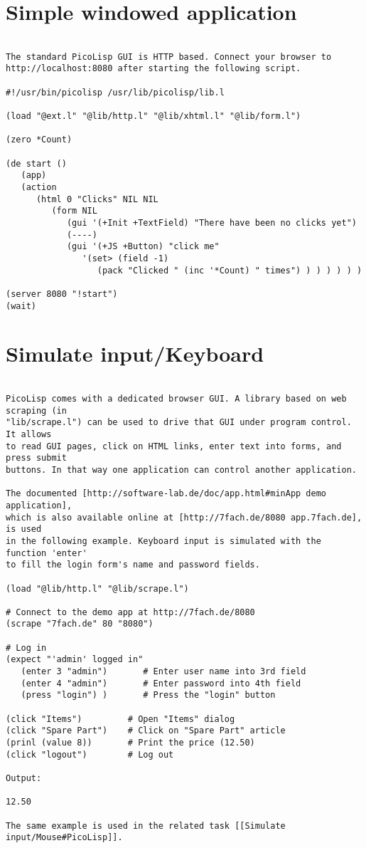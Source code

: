 \section*{Simple windowed application}

\begin{verbatim}

The standard PicoLisp GUI is HTTP based. Connect your browser to
http://localhost:8080 after starting the following script.

#!/usr/bin/picolisp /usr/lib/picolisp/lib.l

(load "@ext.l" "@lib/http.l" "@lib/xhtml.l" "@lib/form.l")

(zero *Count)

(de start ()
   (app)
   (action
      (html 0 "Clicks" NIL NIL
         (form NIL
            (gui '(+Init +TextField) "There have been no clicks yet")
            (----)
            (gui '(+JS +Button) "click me"
               '(set> (field -1)
                  (pack "Clicked " (inc '*Count) " times") ) ) ) ) ) )

(server 8080 "!start")
(wait)

\end{verbatim}

\section*{Simulate input/Keyboard}

\begin{verbatim}

PicoLisp comes with a dedicated browser GUI. A library based on web scraping (in
"lib/scrape.l") can be used to drive that GUI under program control. It allows
to read GUI pages, click on HTML links, enter text into forms, and press submit
buttons. In that way one application can control another application.

The documented [http://software-lab.de/doc/app.html#minApp demo application],
which is also available online at [http://7fach.de/8080 app.7fach.de], is used
in the following example. Keyboard input is simulated with the function 'enter'
to fill the login form's name and password fields.

(load "@lib/http.l" "@lib/scrape.l")

# Connect to the demo app at http://7fach.de/8080
(scrape "7fach.de" 80 "8080")

# Log in
(expect "'admin' logged in"
   (enter 3 "admin")       # Enter user name into 3rd field
   (enter 4 "admin")       # Enter password into 4th field
   (press "login") )       # Press the "login" button

(click "Items")         # Open "Items" dialog
(click "Spare Part")    # Click on "Spare Part" article
(prinl (value 8))       # Print the price (12.50)
(click "logout")        # Log out

Output:

12.50

The same example is used in the related task [[Simulate input/Mouse#PicoLisp]].

\end{verbatim}

